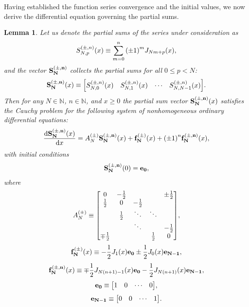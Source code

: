 \documentclass{article}
\newtheorem{lemma}[theorem]{Lemma}
\begin{document}
Having established the function series convergence and the initial values, we now derive the differential equation governing the partial sums.

\begin{lemma}
\label{lem:S_Cauchi}
Let us denote the partial sums of the series under consideration as
\begin{equation}
S^{(\pm, n)}_{N,p}(x) \equiv \sum_{m=0}^{n} \qty(\pm 1)^m J_{Nm+p}(x),
\end{equation}
and the vector $\vb{S^{(\pm, n)}_N}$ collects the partial sums for all $0 \le p < N$:
\begin{equation}
\vb{S^{(\pm,n)}_N}(x) \equiv \mqty[S^{(\pm, n)}_{N,0}(x) & S^{(\pm, n)}_{N,1}(x) & \cdots & S^{(\pm, n)}_{N,N-1}(x)].
\end{equation}
Then for any $N \in \mathbb{N}$, $n \in \mathbb{N}$, and $x \ge 0$ the partial sum vector $\vb{S^{(\pm, n)}_N}(x)$ satisfies the Cauchy problem for the following system of nonhomogeneous ordinary differential equations:
\begin{equation}
\dv{\vb{S^{(\pm, n)}_N}(x)}{x} = A^{(\pm)}_N \vb{S^{(\pm, n)}_N}(x) + \vb{f^{(\pm)}_N}(x) + \qty(\pm 1)^n \vb{f^{(\pm, n)}_N}(x),
\end{equation}
with initial conditions
\begin{equation}
\vb{S^{(\pm, n)}_N}(0) = \vb{e_0},
\end{equation}
where
\begin{equation}
\label{eq:A}
A^{(\pm)}_N \equiv \mqty[
0            & -\frac{1}{2} &              &        & \pm\frac{1}{2} \\
\frac{1}{2}  & 0            & -\frac{1}{2} &        & \\
             & \frac{1}{2}  & \ddots       & \ddots & \\
             &              & \ddots       &        & -\frac{1}{2}\\
\mp\frac{1}{2} &              &              & \frac{1}{2} & 0],
\end{equation}
\begin{equation}
\vb{f^{(\pm)}_N}(x) \equiv -\frac{1}{2} J_1(x) \vb{e_0} \pm \frac{1}{2} J_0(x) \vb{e_{N-1}},
\end{equation}
\begin{equation}
\vb{f^{(\pm, n)}_N}(x) \equiv \mp \frac{1}{2} J_{N(n+1)-1}(x) \vb{e_0} -\frac{1}{2} J_{N(n+1)}(x) \vb{e_{N-1}},
\end{equation}
\begin{equation}
\vb{e_0} \equiv \mqty[1 & 0 & \cdots & 0],
\end{equation}
\begin{equation}
\vb{e_{N-1}} \equiv \mqty[0 & 0 & \cdots & 1].
\end{equation}
\end{lemma}
\end{document}
